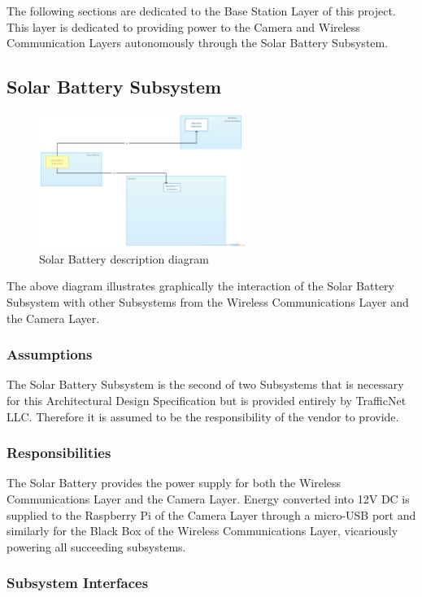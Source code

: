 The following sections are dedicated to the Base Station Layer of this project. This layer is dedicated to providing power to the Camera and Wireless Communication Layers autonomously through the Solar Battery Subsystem.

\subsection{Solar Battery Subsystem}

\begin{figure}[h!]
	\centering
 	\includegraphics[width=0.60\textwidth]{images/ADSdiagrams/solarbatterysubsystem.png}
 \caption{Solar Battery description diagram}
\end{figure}

The above diagram illustrates graphically the interaction of the Solar Battery Subsystem with other Subsystems from the Wireless Communications Layer and the Camera Layer. 

\subsubsection{Assumptions}
The Solar Battery Subsystem is the second of two Subsystems that is necessary for this Architectural Design Specification but is provided entirely by TrafficNet LLC. Therefore it is assumed to be the responsibility of the vendor to provide.

\subsubsection{Responsibilities}
The Solar Battery provides the power supply for both the Wireless Communications Layer and the Camera Layer. Energy converted into 12V DC is supplied to the Raspberry Pi of the Camera Layer through a micro-USB port and similarly for the Black Box of the Wireless Communications Layer, vicariously powering all succeeding subsystems.

\subsubsection{Subsystem Interfaces}

